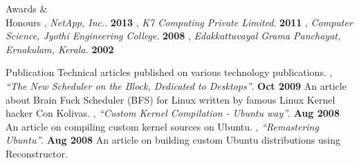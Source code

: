 \documentclass{resume}
\begin{document}
\begin{category}{Awards \&\\ Honours}
  , {\em NetApp, Inc.}. \hfill \textbf{2013}
  , {\em K7 Computing Private Limited}. \hfill \textbf{2011}
  , {\em Computer Science, Jyothi Engineering College}. \hfill \textbf{2008}
  , {\em Edakkattuvayal Grama Panchayat, Ernakulam, Kerala.} \hfill \textbf{2002}
\end{category}


\begin{category}{Publication}
  \citemnobullet Technical articles published on various technology publications.
  , {\em ``The New Scheduler on the Block, Dedicated to Desktops''}. \hfill \textbf{Oct 2009}
  \citemnobullet An article about Brain Fuck Scheduler (BFS) for Linux written by famous Linux Kernel hacker Con Kolivas.
  , {\em ``Custom Kernel Compilation - Ubuntu way''}. \hfill \textbf{Aug 2008}
  \citemnobullet An article on compiling custom kernel sources on Ubuntu.
  , {\em ``Remastering Ubuntu''}. \hfill \textbf{Aug 2008}
  \citemnobullet An article on building custom Ubuntu distributions using Reconstructor.
\end{category}


\end{document}
